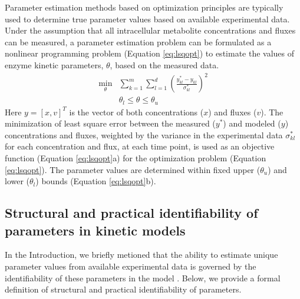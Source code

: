 \documentclass[10pt]{article}
\begin{document}
	Parameter estimation methods based on optimization principles are typically used to determine true parameter values based on available experimental data. Under the assumption that all intracellular metabolite concentrations and fluxes can be measured, a parameter estimation problem can be formulated as a nonlinear programming problem (Equation \ref{eq:lsqopt}) to estimate the values of enzyme kinetic parameters, $\theta$, based on the measured data. 
	\begin{subequations}\label{eq:lsqopt}
		\begin{align}
		\underset{\theta}{\mathrm{min}} &\sum_{k=1}^{m}\sum_{l=1}^{d}\left(\frac{y_{kl}^*-y_{kl}}{\sigma_{kl}^*}\right)^2\\
		&\theta_l \le \theta \le \theta_u
		\end{align}
	\end{subequations}
	Here $y = \left[x, v\right]^T$ is the vector of both concentrations ($x$) and fluxes ($v$). The minimization of least square error between the measured ($y^*$) and modeled ($y$) concentrations and fluxes, weighted by the variance in the experimental data $\sigma_{kl}^*$ for each concentration and flux, at each time point, is used as an objective function (Equation \ref{eq:lsqopt}a) for the optimization problem (Equation \ref{eq:lsqopt}). The parameter values are determined within fixed upper ($\theta_u$) and lower ($\theta_l$) bounds (Equation \ref{eq:lsqopt}b). 
	
	\subsection{Structural and practical identifiability of parameters in kinetic models}\label{sec:ident_def}
	In the Introduction, we briefly metioned that the ability to estimate unique parameter values from available experimental data is governed by the identifiability of these parameters in the model \parencite{Ljung1994,Vanlier2012,Berthoumieux2013,Raue2014}. Below, we provide a formal definition of structural and practical identifiability of parameters.
	
\end{document}
